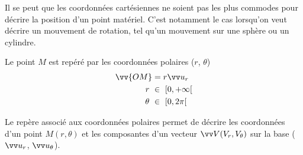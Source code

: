 \documentclass[10.5pt,a4paper]{book}
\begin{document}
Il se peut que les coordonnées cartésiennes ne soient pas les plus commodes pour décrire la position d'un point matériel. C'est notamment le cas lorsqu'on veut décrire un mouvement de rotation, tel qu'un mouvement sur une sphère ou un cylindre.

\begin{boite}

\begin{minipage}{.5\textwidth}
\end{minipage}
\hfill
\begin{minipage}{.48\textwidth}
\begin{flushleft}
Le point $M$ est repéré par les coordonnées polaires ($r$, $\theta$)
\begin{align*}
\vv{OM} &= r \vv u_r  \\ r \ &\in \ [0, +\infty[ \\ \theta \ &\in \ [0, 2\pi[
\end{align*}
\end{flushleft} 
\end{minipage}

Le repère associé aux coordonnées polaires permet de décrire les coordonnées d’un point $M ( r, \theta)$ et les composantes d’un vecteur $\vv V(V_r, V_\theta)$ sur la base ($\vv u_r$, $\vv u_\theta$).\\


\end{boite}
\end{document}
